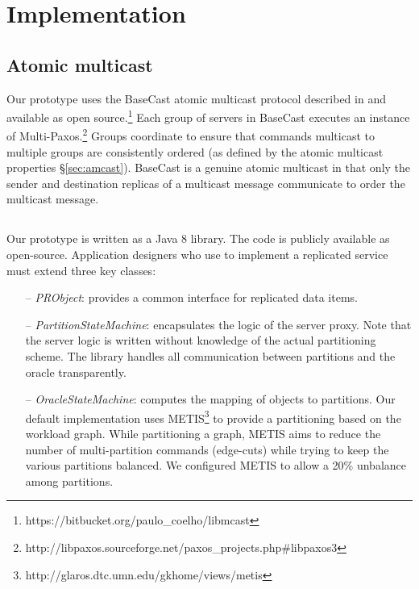 \section{Implementation}
\label{sec:implementation}

\subsection{Atomic multicast}

Our \dynastar prototype uses the BaseCast atomic multicast protocol described in \cite{Coelho:2017} and available as open source.\footnote{https://bitbucket.org/paulo\_coelho/libmcast}
Each group of servers in BaseCast executes an instance of Multi-Paxos.\footnote{http://libpaxos.sourceforge.net/paxos\_projects.php\#libpaxos3}
Groups coordinate to ensure that commands multicast to multiple groups are consistently ordered (as defined by the atomic multicast properties \S\ref{sec:amcast}).
BaseCast is a genuine atomic multicast in that only the sender and destination replicas of a multicast message communicate to order the multicast message. 

\subsection{\dynastar}

Our  \dynastar prototype is written as a
Java 8 library.
The code is publicly available as open-source.
Application designers who use \dynastar
 to implement a replicated service must extend three key classes:
 \begin{itemize}
 \item[--] \emph{PRObject}: provides a common interface for replicated data items.
 \item[--] \emph{PartitionStateMachine}: encapsulates the logic of the server
   proxy. Note that the server logic is written without knowledge of the actual partitioning scheme. The \dynastar library
   handles all communication between partitions and the oracle transparently.
 \item[--] \emph{OracleStateMachine}: computes the mapping of objects to partitions.
Our default implementation uses METIS\footnote{http://glaros.dtc.umn.edu/gkhome/views/metis} to provide a partitioning based on the workload graph.
While partitioning a graph, METIS aims to reduce the number of multi-partition commands (edge-cuts) while trying to keep the various partitions balanced. 
We configured METIS to allow a 20\% unbalance among partitions. 
 \end{itemize}

